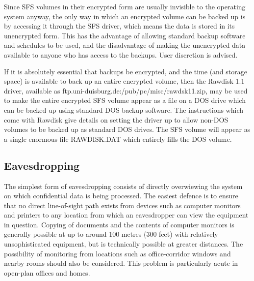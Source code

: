 Since SFS volumes in their encrypted form are usually invisible to the
operating system anyway, the only way in which an encrypted volume can be
backed up is by accessing it through the SFS driver, which means the data is
stored in its unencrypted form.  This has the advantage of allowing standard
backup software and schedules to be used, and the disadvantage of making the
unencrypted data available to anyone who has access to the backups.  User
discretion is advised.

If it is absolutely essential that backups be encrypted, and the time (and
storage space) is available to back up an entire encrypted volume, then the
Rawdisk 1.1 driver, available as ftp.uni-duisburg.de:/pub/pc/misc/rawdsk11.zip,
may be used to make the entire encrypted SFS volume appear as a file on a DOS 
drive which can be backed up using standard DOS backup software.  The 
instructions which come with Rawdisk give details on setting the driver up to 
allow non-DOS volumes to be backed up as standard DOS drives.  The SFS volume 
will appear as a single enormous file RAWDISK.DAT which entirely fills the DOS 
volume.



\subsection{Eavesdropping}

The simplest form of eavesdropping consists of directly overwiewing the system
on which confidential data is being processed.  The easiest defence is to
ensure that no direct line-of-sight path exists from devices such as computer
monitors and printers to any location from which an eavesdropper can view the
equipment in question.  Copying of documents and the contents of computer
monitors is generally possible at up to around 100 metres (300 feet) with
relatively unsophisticated equipment, but is technically possible at greater
distances.  The possibility of monitoring from locations such as
office-corridor windows and nearby rooms should also be considered.  This
problem is particularly acute in open-plan offices and homes.

